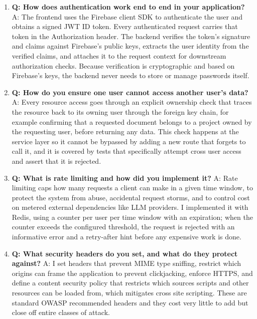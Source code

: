 \documentclass[11pt,a4paper]{report}
\begin{document}
\begin{enumerate}[leftmargin=*]
\item \textbf{Q: How does authentication work end to end in your application?}
A: The frontend uses the Firebase client SDK to authenticate the user and obtains a signed JWT ID token. Every authenticated request carries that token in the Authorization header. The backend verifies the token's signature and claims against Firebase's public keys, extracts the user identity from the verified claims, and attaches it to the request context for downstream authorization checks. Because verification is cryptographic and based on Firebase's keys, the backend never needs to store or manage passwords itself.

\item \textbf{Q: How do you ensure one user cannot access another user's data?}
A: Every resource access goes through an explicit ownership check that traces the resource back to its owning user through the foreign key chain, for example confirming that a requested document belongs to a project owned by the requesting user, before returning any data. This check happens at the service layer so it cannot be bypassed by adding a new route that forgets to call it, and it is covered by tests that specifically attempt cross user access and assert that it is rejected.

\item \textbf{Q: What is rate limiting and how did you implement it?}
A: Rate limiting caps how many requests a client can make in a given time window, to protect the system from abuse, accidental request storms, and to control cost on metered external dependencies like LLM providers. I implemented it with Redis, using a counter per user per time window with an expiration; when the counter exceeds the configured threshold, the request is rejected with an informative error and a retry-after hint before any expensive work is done.

\item \textbf{Q: What security headers do you set, and what do they protect against?}
A: I set headers that prevent MIME type sniffing, restrict which origins can frame the application to prevent clickjacking, enforce HTTPS, and define a content security policy that restricts which sources scripts and other resources can be loaded from, which mitigates cross site scripting. These are standard OWASP recommended headers and they cost very little to add but close off entire classes of attack.


\end{enumerate}
\end{document}
